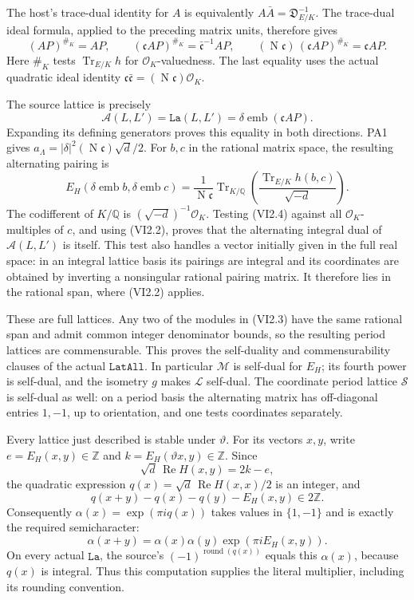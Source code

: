 The host's trace-dual identity for \(A\) is equivalently
\(A\bar A=\mathfrak D_{E/K}^{-1}\). The trace-dual ideal formula,
applied to the preceding matrix units, therefore gives
\[
 (AP)^{\#_K}=AP,\qquad
 (\mathfrak c AP)^{\#_K}=\bar{\mathfrak c}^{-1}AP,\qquad
 (\operatorname N\mathfrak c)\,
       (\mathfrak c AP)^{\#_K}=\mathfrak c AP.
 \tag{VI2.2}
\]
Here \(\#_K\) tests \(\operatorname{Tr}_{E/K}h\) for
\(\mathcal O_K\)-valuedness. The last equality uses the actual
quadratic ideal identity
\(\mathfrak c\bar{\mathfrak c}=
(\operatorname N\mathfrak c)\mathcal O_K\).

The source lattice is precisely
\[
 \mathcal A(L,L')=\texttt{La}(L,L')
                 =\delta\operatorname{emb}(\mathfrak c AP).
 \tag{VI2.3}
\]
Expanding its defining generators proves this equality in both
directions. PA1 gives
\(a_\Lambda=|\delta|^2(\operatorname N\mathfrak c)\sqrt d/2\).
For \(b,c\) in the rational matrix space, the resulting alternating
pairing is
\[
 E_H(\delta\operatorname{emb}b,\delta\operatorname{emb}c)
 =\frac{1}{\operatorname N\mathfrak c}
    \operatorname{Tr}_{K/\mathbb Q}
       \left(\frac{\operatorname{Tr}_{E/K}h(b,c)}
                         {\sqrt{-d}}\right).
 \tag{VI2.4}
\]
The codifferent of \(K/\mathbb Q\) is
\((\sqrt{-d})^{-1}\mathcal O_K\). Testing (VI2.4) against all
\(\mathcal O_K\)-multiples of \(c\), and using (VI2.2), proves
that the alternating integral dual of \(\mathcal A(L,L')\)
is itself. This test also handles a vector initially given in
the full real space: in an integral lattice basis its pairings
are integral and its coordinates are obtained by inverting a
nonsingular rational pairing matrix. It therefore lies in the
rational span, where (VI2.2) applies.

These are full lattices. Any two of the modules in (VI2.3) have
the same rational span and admit common integer denominator
bounds, so the resulting period lattices are commensurable.
This proves the self-duality and commensurability clauses of the
actual \(\texttt{LatAll}\). In particular \(\mathcal M\) is
self-dual for \(E_H\); its fourth power is self-dual, and the
isometry \(g\) makes \(\mathcal L\) self-dual. The coordinate
period lattice \(\mathcal S\) is self-dual as well: on a period
basis the alternating matrix has off-diagonal entries \(1,-1\),
up to orientation, and one tests coordinates separately.

Every lattice just described is stable under \(\vartheta\).
For its vectors \(x,y\), write
\(e=E_H(x,y)\in\mathbb Z\) and
\(k=E_H(\vartheta x,y)\in\mathbb Z\). Since
\[
 \sqrt d\,\operatorname{Re}H(x,y)=2k-e,
 \tag{VI2.5}
\]
the quadratic expression
\(q(x)=\sqrt d\,\operatorname{Re}H(x,x)/2\) is an integer,
and
\[
 q(x+y)-q(x)-q(y)-E_H(x,y)\in2\mathbb Z.
 \tag{VI2.6}
\]
Consequently \(\alpha(x)=\exp(\pi i q(x))\) takes values in
\(\{1,-1\}\) and is exactly the required semicharacter:
\[
 \alpha(x+y)=\alpha(x)\alpha(y)\exp(\pi iE_H(x,y)).
 \tag{VI2.7}
\]
On every actual \(\texttt{La}\), the source's
\((-1)^{\operatorname{round}(q(x))}\) equals this \(\alpha(x)\),
because \(q(x)\) is integral. Thus this computation supplies the
literal multiplier, including its rounding convention.

